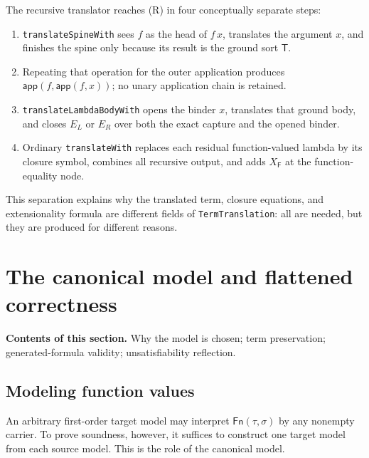 \documentclass[11pt]{article}
\theoremstyle{remark}
\newcommand{\sectioncontents}[1]{%
  \smallskip\noindent\textbf{Contents of this section.} #1\par\medskip}
\newcommand{\Fn}{\mathsf{Fn}}
\newcommand{\app}{\mathsf{app}}
\newcommand{\TreeTy}{\mathsf{T}}
\newcommand{\TreeFun}{\mathsf{F}}
\begin{document}
The recursive translator reaches (R) in four conceptually separate steps:
\begin{enumerate}[leftmargin=*]
 \item \texttt{translateSpineWith} sees $f$ as the head of $f\,x$, translates
       the argument $x$, and finishes the spine only because its result is the
       ground sort $\TreeTy$.
 \item Repeating that operation for the outer application produces
       $\app(f,\app(f,x))$; no unary application chain is retained.
 \item \texttt{translateLambdaBodyWith} opens the binder $x$, translates that
       ground body, and closes $E_L$ or $E_R$ over both the exact capture and
       the opened binder.
 \item Ordinary \texttt{translateWith} replaces each residual function-valued
       lambda by its closure symbol, combines all recursive output, and adds
       $X_{\TreeFun}$ at the function-equality node.
\end{enumerate}
This separation explains why the translated term, closure equations, and
extensionality formula are different fields of \texttt{TermTranslation}:
all are needed, but they are produced for different reasons.

\section{The canonical model and flattened correctness}
\sectioncontents{Why the model is chosen; term preservation; generated-formula validity; unsatisfiability reflection.}

\subsection{Modeling function values}

An arbitrary first-order target model may interpret $\Fn(\tau,\sigma)$ by any
nonempty carrier. To prove soundness, however, it suffices to construct one
target model from each source model. This is the role of the canonical model.
\end{document}
